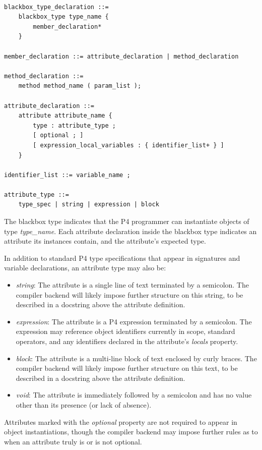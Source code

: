 \documentclass[12pt]{article}
\begin{document}
\begin{lstlisting}[style=BNFstyle]

blackbox_type_declaration ::= 
    blackbox_type type_name {
        member_declaration*
    }

member_declaration ::= attribute_declaration | method_declaration

method_declaration ::= 
    method method_name ( param_list );

attribute_declaration ::= 
    attribute attribute_name {
        type : attribute_type ;
        [ optional ; ]
        [ expression_local_variables : { identifier_list+ } ]
    }

identifier_list ::= variable_name ;

attribute_type ::= 
    type_spec | string | expression | block

\end{lstlisting}

The blackbox type indicates that the P4 programmer can instantiate objects of
type \textit{type_name}. Each attribute declaration inside the blackbox type 
indicates an attribute its instances contain, and the attribute's expected type.

In addition to standard P4 type specifications that appear in signatures
and variable declarations, an attribute type may also be:
\begin{itemize}
\item
\textit{string}: The attribute is a single line of text terminated by a
semicolon. The compiler backend will likely impose further structure on this
string, to be described in a docstring above the attribute definition.
\item
\textit{expression}: The attribute is a P4 expression terminated by a semicolon.
The expression may reference object identifiers currently in scope, standard
operators, and any identifiers declared in the attribute's \textit{locals}
property.
\item
\textit{block}: The attribute is a multi-line block of text enclosed by curly
braces. The compiler backend will likely impose further structure on this
text, to be described in a docstring above the attribute definition.
\item
\textit{void}: The attribute is immediately followed by a semicolon and has
no value other than its presence (or lack of absence).
\end{itemize}
Attributes marked with the \textit{optional} property are not required to
appear in object instantiations, though the compiler backend may impose further
rules as to when an attribute truly is or is not optional.
\end{document}

